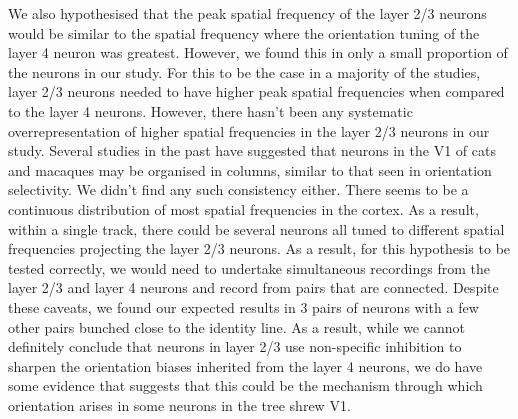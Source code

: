 We also hypothesised that the peak spatial frequency of the layer 2/3 neurons would be similar to the spatial frequency where the orientation tuning of the layer 4 neuron was greatest. However, we found this in only a small proportion of the neurons in our study. For this to be the case in a majority of the studies, layer 2/3 neurons needed to have higher peak spatial frequencies when compared to the layer 4 neurons. However, there hasn't been any systematic overrepresentation of higher spatial frequencies in the layer 2/3 neurons in our study. Several studies in the past have suggested that neurons in the V1 of cats and macaques may be organised in columns, similar to that seen in orientation selectivity. We didn't find any such consistency either. There seems to be a continuous distribution of most spatial frequencies in the cortex. As a result, within a single track, there could be several neurons all tuned to different spatial frequencies projecting the layer 2/3 neurons. As a result, for this hypothesis to be tested correctly, we would need to undertake simultaneous recordings from the layer 2/3 and layer 4 neurons and record from pairs that are connected. Despite these caveats, we found our expected results in 3 pairs of neurons with a few other pairs bunched close to the identity line. As a result, while we cannot definitely conclude that neurons in layer 2/3 use non-specific inhibition to sharpen the orientation biases inherited from the layer 4 neurons, we do have some evidence that suggests that this could be the mechanism through which orientation arises in some neurons in the tree shrew V1. 

